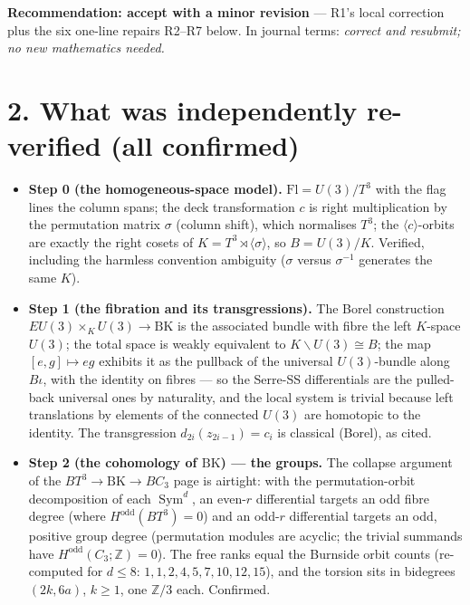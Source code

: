\documentclass[11pt,a4paper]{article}
\newcommand{\Z}{\mathbb{Z}}
\newcommand{\BK}{\mathrm{BK}}
\newcommand{\Fl}{\mathrm{Fl}}
\begin{document}
\textbf{Recommendation: accept with a minor revision} --- R1's local
correction plus the six one-line repairs R2--R7 below. In journal terms:
\emph{correct and resubmit; no new mathematics needed.}

\section*{2. What was independently re-verified (all confirmed)}

\begin{itemize}[leftmargin=1.4em,itemsep=2pt]

\item \textbf{Step 0 (the homogeneous-space model).}
$\Fl=U(3)/T^3$ with the flag lines the column spans; the deck transformation
$c$ is right multiplication by the permutation matrix $\sigma$ (column
shift), which normalises $T^3$; the $\langle c\rangle$-orbits are exactly the
right cosets of $K=T^3\rtimes\langle\sigma\rangle$, so $B=U(3)/K$. Verified,
including the harmless convention ambiguity ($\sigma$ versus $\sigma^{-1}$
generates the same $K$).

\item \textbf{Step 1 (the fibration and its transgressions).} The Borel
construction $EU(3)\times_K U(3)\to\BK$ is the associated bundle with fibre
the left $K$-space $U(3)$; the total space is weakly equivalent to
$K\backslash U(3)\cong B$; the map $[e,g]\mapsto eg$ exhibits it as the
pullback of the universal $U(3)$-bundle along $B\iota$, with the identity on
fibres --- so the Serre-SS differentials are the pulled-back universal ones by
naturality, and the local system is trivial because left translations by
elements of the connected $U(3)$ are homotopic to the identity. The
transgression $d_{2i}(z_{2i-1})=c_i$ is classical (Borel), as cited.

\item \textbf{Step 2 (the cohomology of $\BK$) --- the groups.} The collapse
argument of the $BT^3\to\BK\to BC_3$ page is airtight: with the
permutation-orbit decomposition of each $\operatorname{Sym}^d$, an even-$r$
differential targets an odd fibre degree (where $H^{\mathrm{odd}}(BT^3)=0$)
and an odd-$r$ differential targets an odd, positive group degree (permutation
modules are acyclic; the trivial summands have $H^{\mathrm{odd}}(C_3;\Z)=0$).
The free ranks equal the Burnside orbit counts (re-computed for $d\le8$:
$1,1,2,4,5,7,10,12,15$), and the torsion sits in bidegrees $(2k,6a)$, $k\ge1$,
one $\Z/3$ each. Confirmed.


\end{itemize}
\end{document}
